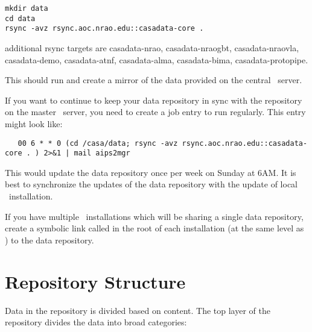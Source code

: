 \begin{verbatim}
mkdir data
cd data
rsync -avz rsync.aoc.nrao.edu::casadata-core .
\end{verbatim}

additional rsync targets are casadata-nrao, casadata-nraogbt, casadata-nraovla,
casadata-demo, casadata-atnf, casadata-alma, casadata-bima, casadata-protopipe.


\noindent
This should run
and create a mirror of the data provided on the central \aipspp\ server.

If you want to continue to keep your data repository in sync with the repository
on the master \aipspp\ server, you need to create a  job entry to
run  regularly. This entry might look like:

\begin{verbatim}
   00 6 * * 0 (cd /casa/data; rsync -avz rsync.aoc.nrao.edu::casadata-core . ) 2>&1 | mail aips2mgr
\end{verbatim}

\noindent
This would update the data repository once per week on Sunday at 6AM. It is
best to synchronize the updates of the data repository with the update of
local \aipspp\ installation.

If you have multiple \aipspp\ installations which will be sharing a single
data repository, create a symbolic link called  in the root of
each installation (at the same level as ) to the data repository.

\section{Repository Structure}
\label{data repository structure}

Data in the repository is divided based on content. The top layer of the
repository divides the data into broad categories:

